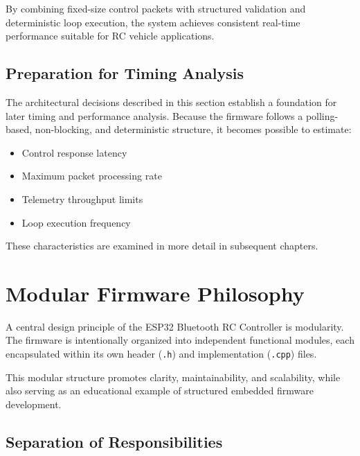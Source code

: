 By combining fixed-size control packets with structured validation and deterministic loop execution, the system achieves consistent real-time performance suitable for RC vehicle applications.

\subsection{Preparation for Timing Analysis}

The architectural decisions described in this section establish a foundation for later timing and performance analysis. Because the firmware follows a polling-based, non-blocking, and deterministic structure, it becomes possible to estimate:

\begin{itemize}
	\item Control response latency
	\item Maximum packet processing rate
	\item Telemetry throughput limits
	\item Loop execution frequency
\end{itemize}

These characteristics are examined in more detail in subsequent chapters.

















\section{Modular Firmware Philosophy}

A central design principle of the ESP32 Bluetooth RC Controller is modularity. The firmware is intentionally organized into independent functional modules, each encapsulated within its own header (\texttt{.h}) and implementation (\texttt{.cpp}) files.

This modular structure promotes clarity, maintainability, and scalability, while also serving as an educational example of structured embedded firmware development.

\subsection{Separation of Responsibilities}

